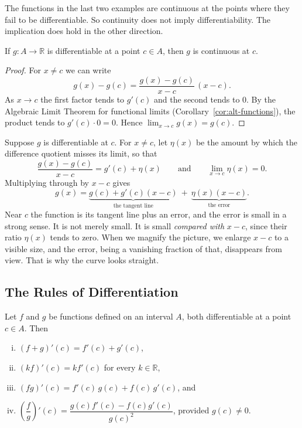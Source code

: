The functions in the last two examples are continuous at the points where they fail to be differentiable.  So continuity does not imply differentiability.  The implication does hold in the other direction.

\begin{theorem}\label{thm:diff-implies-cont}
If $g : A \to \mathbb{R}$ is differentiable at a point $c \in A$, then $g$ is continuous at $c$.
\end{theorem}

\begin{proof}
For $x \neq c$ we can write
\[ g(x) - g(c) = \frac{g(x) - g(c)}{x - c}\,(x - c). \]
As $x \to c$ the first factor tends to $g'(c)$ and the second tends to $0$.  By the Algebraic Limit Theorem for functional limits (Corollary~\ref{cor:alt-functions}), the product tends to $g'(c) \cdot 0 = 0$.  Hence $\lim_{x \to c} g(x) = g(c)$.
\end{proof}

  Suppose $g$ is differentiable at $c$.  For $x \neq c$, let $\eta(x)$ be the amount by which the difference quotient misses its limit, so that
\[ \frac{g(x) - g(c)}{x - c} = g'(c) + \eta(x) \qquad \text{and} \qquad \lim_{x \to c} \eta(x) = 0. \]
Multiplying through by $x - c$ gives
\[ g(x) = \underbrace{g(c) + g'(c)(x - c)}_{\text{the tangent line}} \ +\ \underbrace{\eta(x)(x - c)}_{\text{the error}}. \]
Near $c$ the function is its tangent line plus an error, and the error is small in a strong sense.  It is not merely small.  It is small \emph{compared with} $x - c$, since their ratio $\eta(x)$ tends to zero.  When we magnify the picture, we enlarge $x - c$ to a visible size, and the error, being a vanishing fraction of that, disappears from view.  That is why the curve looks straight.

\subsection{The Rules of Differentiation}

\begin{theorem}\label{thm:alg-diff}
Let $f$ and $g$ be functions defined on an interval $A$, both differentiable at a point $c \in A$.  Then
\begin{enumerate}[(i)]
	\item $(f + g)'(c) = f'(c) + g'(c)$,
	\item $(kf)'(c) = k f'(c)$ for every $k \in \mathbb{R}$,
	\item $(fg)'(c) = f'(c)\,g(c) + f(c)\,g'(c)$, and
	\item $\left(\dfrac{f}{g}\right)'(c) = \dfrac{g(c) f'(c) - f(c) g'(c)}{g(c)^2}$, provided $g(c) \neq 0$.
\end{enumerate}
\end{theorem}

